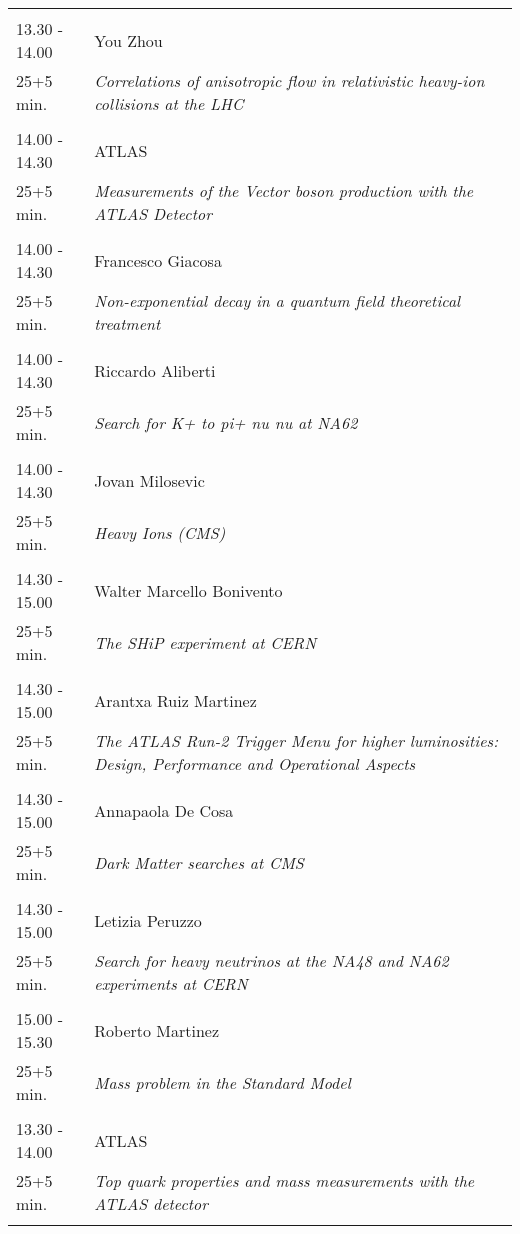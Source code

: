 \begin{longtable}{p{3cm}p{13cm}}
 & \\ 
13.30 - 14.00 & You Zhou\\ 
25+5 min. & {\it Correlations of anisotropic flow in relativistic heavy-ion collisions at the LHC}\\ 
 & \\ 
14.00 - 14.30 & ATLAS\\ 
25+5 min. & {\it Measurements of the Vector boson production with the ATLAS Detector}\\ 
 & \\ 
14.00 - 14.30 & Francesco Giacosa\\ 
25+5 min. & {\it Non-exponential decay in a quantum field theoretical treatment}\\ 
 & \\ 
14.00 - 14.30 & Riccardo Aliberti\\ 
25+5 min. & {\it Search for K+ to pi+ nu nu at NA62}\\ 
 & \\ 
14.00 - 14.30 & Jovan Milosevic\\ 
25+5 min. & {\it Heavy Ions (CMS)}\\ 
 & \\ 
14.30 - 15.00 & Walter Marcello Bonivento\\ 
25+5 min. & {\it The SHiP experiment at CERN}\\ 
 & \\ 
14.30 - 15.00 & Arantxa Ruiz Martinez\\ 
25+5 min. & {\it The ATLAS Run-2 Trigger Menu for higher luminosities: Design, Performance and Operational Aspects}\\ 
 & \\ 
14.30 - 15.00 & Annapaola De Cosa\\ 
25+5 min. & {\it Dark Matter searches at CMS}\\ 
 & \\ 
14.30 - 15.00 & Letizia Peruzzo\\ 
25+5 min. & {\it Search for heavy neutrinos at the NA48 and NA62 experiments at CERN}\\ 
 & \\ 
15.00 - 15.30 & Roberto Martinez\\ 
25+5 min. & {\it Mass problem in the Standard Model}\\ 
 & \\ 
13.30 - 14.00 & ATLAS\\ 
25+5 min. & {\it Top quark properties and mass measurements with the ATLAS detector}\\ 
 & \\ 

\end{longtable}
